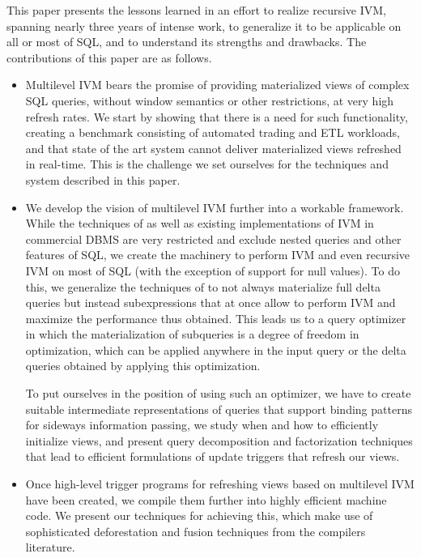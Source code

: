 This paper presents the lessons learned in an effort to realize recursive IVM, spanning nearly three years of intense work, to generalize it to be applicable on all or most of SQL, and to understand its strengths and drawbacks.
The contributions of this paper are as follows.
\begin{itemize}
\item
Multilevel IVM bears the promise of providing materialized views of complex SQL queries, without
window semantics or other restrictions, at very high refresh rates. We start by showing that there is
a need for such functionality, creating a benchmark consisting of automated trading and ETL workloads,
and that state of the art system cannot deliver materialized views refreshed in real-time.
This is the challenge we set ourselves for the techniques and system described in this paper.

\item
We develop the vision of multilevel IVM further into a workable framework.
While the techniques of \cite{ahmad-vldb:09, koch-pods:10} as well as existing implementations of
IVM in commercial DBMS are very restricted and exclude nested queries and other features of SQL,
we create the machinery to perform IVM and even recursive IVM on most of SQL (with the exception of
support for null values). To do this, we generalize the techniques of \cite{ahmad-vldb:09, koch-pods:10}
to not always materialize full delta queries but instead subexpressions that at once allow to perform
IVM and maximize the performance thus obtained. This leads us to a query optimizer in which
the materialization of subqueries is a degree of freedom in optimization, which can be applied anywhere
in the input query or the delta queries obtained by applying this optimization.

To put ourselves in the position of using such an optimizer, we have to create suitable
intermediate representations of queries that support binding patterns for sideways information
passing, we study when and how to efficiently initialize views, and present query decomposition
and factorization techniques that lead to efficient formulations of update triggers that refresh our
views.

\item
Once high-level trigger programs for refreshing views based on multilevel IVM have been created,
we compile them further into highly efficient machine code.
We present our techniques for achieving this, which make use of sophisticated deforestation and
fusion techniques from the compilers literature.


\end{itemize}
